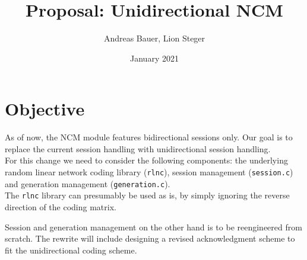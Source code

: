 \documentclass[a4paper, 11pt]{article}
\title{Proposal: Unidirectional NCM}
\author{Andreas Bauer, Lion Steger}
\date{January 2021}
\newcommand{\ilc}[1]{\texttt{#1}} %
\begin{document}
    \maketitle

    \section{Objective}\label{sec:objective}
    As of now, the NCM module features bidirectional sessions only.
    Our goal is to replace the current session handling with unidirectional session handling.
    \\

    For this change we need to consider the following components: the underlying random linear network coding library (\ilc{rlnc}),
    session management (\ilc{session.c}) and generation management (\ilc{generation.c}).
    \\

    The \ilc{rlnc} library can presumably be used as is, by simply ignoring the reverse direction of the coding matrix.

    Session and generation management on the other hand is to be reengineered from scratch.
    The rewrite will include designing a revised acknowledgment scheme to fit the unidirectional coding scheme.
\end{document}
